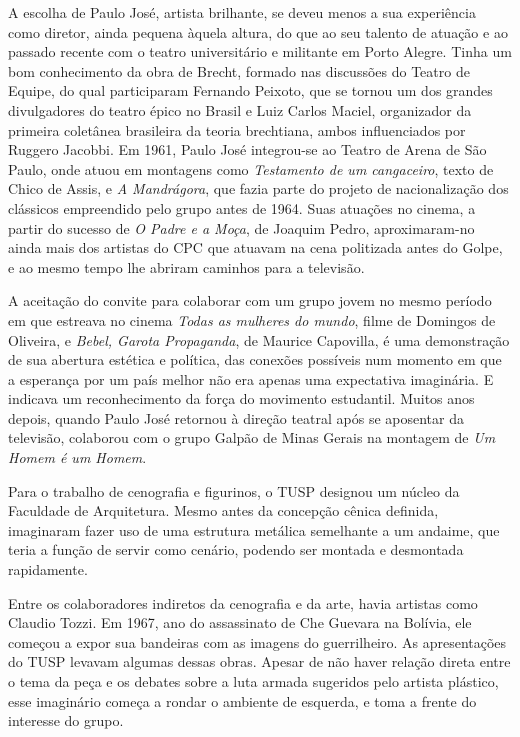 A escolha de Paulo José, artista brilhante, se deveu menos a sua
experiência como diretor, ainda pequena àquela altura, do que ao seu
talento de atuação e ao passado recente com o teatro universitário e
militante em Porto Alegre. Tinha um bom conhecimento da obra de Brecht,
formado nas discussões do Teatro de Equipe, do qual participaram
Fernando Peixoto, que se tornou um dos grandes divulgadores do teatro
épico no Brasil e Luiz Carlos Maciel, organizador da primeira coletânea
brasileira da teoria brechtiana, ambos influenciados por Ruggero
Jacobbi. Em 1961, Paulo José integrou-se ao Teatro de Arena de São
Paulo, onde atuou em montagens como \textit{Testamento de um cangaceiro},
texto de Chico de Assis, e \textit{A Mandrágora}, que fazia parte do
projeto de nacionalização dos clássicos empreendido pelo grupo antes de
1964. Suas atuações no cinema, a partir do sucesso de \textit{O Padre e a
Moça}, de Joaquim Pedro, aproximaram-no ainda mais dos artistas do CPC
que atuavam na cena politizada antes do Golpe, e ao mesmo tempo lhe
abriram caminhos para a televisão.

A aceitação do convite para colaborar com um grupo jovem no mesmo
período em que estreava no cinema \textit{Todas as mulheres do mundo},
filme de Domingos de Oliveira, e \textit{Bebel, Garota Propaganda}, de
Maurice Capovilla, é uma demonstração de sua abertura estética e
política, das conexões possíveis num momento em que a esperança por um
país melhor não era apenas uma expectativa imaginária. E indicava um
reconhecimento da força do movimento estudantil. Muitos anos depois,
quando Paulo José retornou à direção teatral após se aposentar da
televisão, colaborou com o grupo Galpão de Minas Gerais na montagem de
\textit{Um Homem é um Homem}.

Para o trabalho de cenografia e figurinos, o TUSP designou um núcleo da
Faculdade de Arquitetura. Mesmo antes da concepção cênica definida,
imaginaram fazer uso de uma estrutura metálica semelhante a um andaime,
que teria a função de servir como cenário, podendo ser montada e
desmontada rapidamente.

Entre os colaboradores indiretos da cenografia e da arte, havia artistas
como Claudio Tozzi. Em 1967, ano do assassinato de Che Guevara na
Bolívia, ele começou a expor sua bandeiras com as imagens do
guerrilheiro. As apresentações do TUSP levavam algumas dessas obras.
Apesar de não haver relação direta entre o tema da peça e os debates
sobre a luta armada sugeridos pelo artista plástico, esse imaginário
começa a rondar o ambiente de esquerda, e toma a frente do interesse do
grupo.

